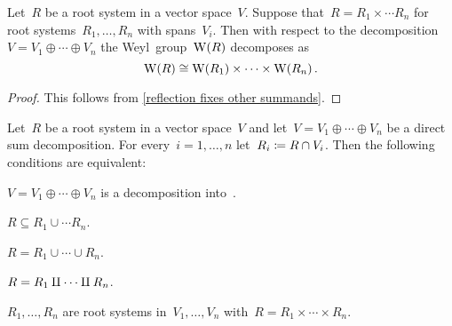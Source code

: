 \begin{lemma}
  \label{decomposition of weyl group}
  Let~$R$ be a root system in a vector space~$V$.
  Suppose that~$R = R_1 \times \dotsb R_n$ for root systems~$R_1, \dotsc, R_n$ with spans~$V_i$.
  Then with respect to the decomposition~$V = V_1 \oplus \dotsb \oplus V_n$ the Weyl~group~$\operatorname{W}(R)$ decomposes as
  \[
    \operatorname{W}(R)
    \cong
    \operatorname{W}(R_1) \times \dotsb \times \operatorname{W}(R_n) \,.
  \]
\end{lemma}


\begin{proof}
  This follows from \cref{reflection fixes other summands}.
\end{proof}


\begin{lemma}
  \label{characterizations of root system decompositions}
  Let~$R$ be a root system in a vector space~$V$ and let~$V = V_1 \oplus \dotsb \oplus V_n$ be a direct sum decomposition.
  For every~$i = 1, \dotsc, n$ let~$R_i \coloneqq R \cap V_i$.
  Then the following conditions are equivalent:
  \begin{equivalenceslist}
    \item
      \label{decomposition into subreps}
      $V = V_1 \oplus \dotsb \oplus V_n$ is a decomposition into~{}.
    \item
      \label{contained in union}
      $R \subseteq R_1 \cup \dotsb R_n$.
    \item
      \label{decomposition into subsets}
      $R = R_1 \cup \dotsb \cup R_n$.
    \item
      \label{disjoint decomposition into subsets}
      $R = R_1 \amalg \dotsb \amalg R_n$.
    \item
      \label{decomposition into root systems}
      $R_1, \dotsc, R_n$ are root systems in~$V_1, \dotsc, V_n$ with~$R = R_1 \times \dotsb \times R_n$.
  \end{equivalenceslist}
\end{lemma}


